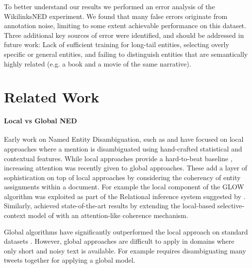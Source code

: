 \documentclass[11pt]{article}
\begin{document}
	To better understand our results we performed an error analysis of the WikilinksNED experiment. We found that many false errors originate from annotation noise, limiting to some extent achievable performance on this dataset. Three additional key sources of error were identified, and should be addressed in future work: Lack of sufficient training for long-tail entities, selecting overly specific or general entities, and failing to distinguish entities that are semantically highly related (e.g. a book and a movie of the same narrative). 
	
	\section{Related Work}
	
	\paragraph{Local vs Global NED}
	
	Early work on Named Entity Disambiguation, such as  and  have focused on local approaches where a mention is disambiguated using hand-crafted statistical and contextual features. While local approaches provide a hard-to-beat baseline \cite{Ratinov2011}, increasing attention was recently given to global approaches. These add a layer of sophistication on top of local approaches by considering the coherency of entity assignments within a document. For example the local component of the GLOW algorithm \cite{Ratinov2011} was exploited as part of the Relational inference system suggested by . Similarly,  achieved state-of-the-art results by extending the local-based selective-context model of  with an attention-like coherence mechanism. 
	
	Global algorithms have significantly outperformed the local approach on standard datasets \cite{guo2014entity,pershina2015personalized,Globerson2016}.
	However, global approaches are difficult to apply in domains where only short and noisy text is available. For example  requires disambiguating many tweets together for applying a global model. 
	
	
\end{document}
